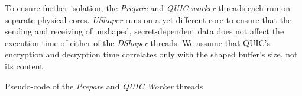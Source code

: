 To ensure further isolation, the \textit{Prepare} and \textit{QUIC worker} threads each run on separate physical cores.
\textit{UShaper} runs on a yet different core to ensure that the sending and receiving of unshaped, secret-dependent data does not affect the execution time of either of the \textit{DShaper} threads.
We assume that QUIC's encryption and decryption time correlates only with the shaped buffer's size, not its content.




\captionsetup{type=lstlisting}
\caption{Pseudo-code of the \textit{Prepare} and \textit{QUIC Worker} threads}
\label{lst:prepare_and_worker}
